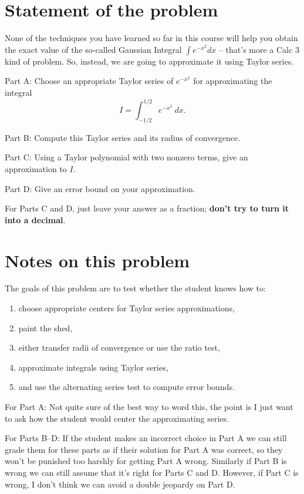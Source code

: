 \documentclass[10pt]{article}
\theoremstyle{definition}
\begin{document}
\noindent

\section{Statement of the problem}
None of the techniques you have learned so far in this course will help you obtain the exact value of the so-called Gaussian Integral $\int e^{-x^2} dx$ -- that's more a Calc 3 kind of problem.
So, instead, we are going to approximate it using Taylor series.

Part A: Choose an appropriate Taylor series of $e^{-x^2}$ for approximating the integral
$$I = \int_{-1/2}^{1/2} e^{-x^2} ~dx.$$

Part B: Compute this Taylor series and its radius of convergence.

Part C: Using a Taylor polynomial with two nonzero terms, give an approximation to $I$. 

Part D: Give an error bound on your approximation.

For Parts C and D, just leave your answer as a fraction; \textbf{don't try to turn it into a decimal}.

\section{Notes on this problem}
The goals of this problem are to test whether the student knows how to:
\begin{enumerate}
\item choose appropriate centers for Taylor series approximations,
\item paint the shed,
\item either transfer radii of convergence or use the ratio test, 
\item approximate integrals using Taylor series,
\item and use the alternating series test to compute error bounds.
\end{enumerate}

For Part A: Not quite sure of the best way to word this, the point is I just want to ask how the student would center the approximating series.

For Parts B--D: If the student makes an incorrect choice in Part A we can still grade them for these parts as if their solution for Part A was correct, so they won't be punished too harshly for getting Part A wrong. Similarly if Part B is wrong we can still assume that it's right for Parts C and D. However, if Part C is wrong, I don't think we can avoid a double jeopardy on Part D.
\end{document}
